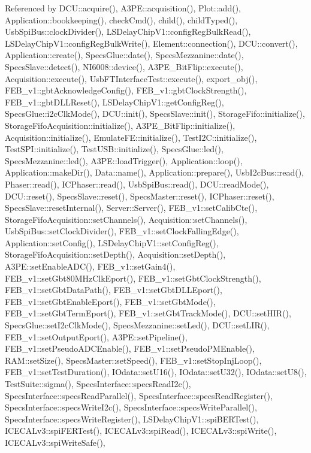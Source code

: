 Referenced by D\+C\+U\+::acquire(), A3\+P\+E\+::acquisition(), Plot\+::add(), Application\+::bookkeeping(), check\+Cmd(), child(), child\+Typed(), Usb\+Spi\+Bus\+::clock\+Divider(), L\+S\+Delay\+Chip\+V1\+::config\+Reg\+Bulk\+Read(), L\+S\+Delay\+Chip\+V1\+::config\+Reg\+Bulk\+Write(), Element\+::connection(), D\+C\+U\+::convert(), Application\+::create(), Specs\+Glue\+::date(), Specs\+Mezzanine\+::date(), Specs\+Slave\+::detect(), N\+I6008\+::device(), A3\+P\+E\+\_\+\+Bit\+Flip\+::execute(), Acquisition\+::execute(), Usb\+F\+T\+Interface\+Test\+::execute(), export\+\_\+obj(), F\+E\+B\+\_\+v1\+::gbt\+Acknowledge\+Config(), F\+E\+B\+\_\+v1\+::gbt\+Clock\+Strength(), F\+E\+B\+\_\+v1\+::gbt\+D\+L\+L\+Reset(), L\+S\+Delay\+Chip\+V1\+::get\+Config\+Reg(), Specs\+Glue\+::i2c\+Clk\+Mode(), D\+C\+U\+::init(), Specs\+Slave\+::init(), Storage\+Fifo\+::initialize(), Storage\+Fifo\+Acquisition\+::initialize(), A3\+P\+E\+\_\+\+Bit\+Flip\+::initialize(), Acquisition\+::initialize(), Emulate\+F\+E\+::initialize(), Test\+I2\+C\+::initialize(), Test\+S\+P\+I\+::initialize(), Test\+U\+S\+B\+::initialize(), Specs\+Glue\+::led(), Specs\+Mezzanine\+::led(), A3\+P\+E\+::load\+Trigger(), Application\+::loop(), Application\+::make\+Dir(), Data\+::name(), Application\+::prepare(), Usb\+I2c\+Bus\+::read(), Phaser\+::read(), I\+C\+Phaser\+::read(), Usb\+Spi\+Bus\+::read(), D\+C\+U\+::read\+Mode(), D\+C\+U\+::reset(), Specs\+Slave\+::reset(), Specs\+Master\+::reset(), I\+C\+Phaser\+::reset(), Specs\+Slave\+::reset\+Internal(), Server\+::\+Server(), F\+E\+B\+\_\+v1\+::set\+Calib\+Cte(), Storage\+Fifo\+Acquisition\+::set\+Channels(), Acquisition\+::set\+Channels(), Usb\+Spi\+Bus\+::set\+Clock\+Divider(), F\+E\+B\+\_\+v1\+::set\+Clock\+Falling\+Edge(), Application\+::set\+Config(), L\+S\+Delay\+Chip\+V1\+::set\+Config\+Reg(), Storage\+Fifo\+Acquisition\+::set\+Depth(), Acquisition\+::set\+Depth(), A3\+P\+E\+::set\+Enable\+A\+D\+C(), F\+E\+B\+\_\+v1\+::set\+Gain4(), F\+E\+B\+\_\+v1\+::set\+Gbt80\+M\+Hz\+Clk\+Eport(), F\+E\+B\+\_\+v1\+::set\+Gbt\+Clock\+Strength(), F\+E\+B\+\_\+v1\+::set\+Gbt\+Data\+Path(), F\+E\+B\+\_\+v1\+::set\+Gbt\+D\+L\+L\+Eport(), F\+E\+B\+\_\+v1\+::set\+Gbt\+Enable\+Eport(), F\+E\+B\+\_\+v1\+::set\+Gbt\+Mode(), F\+E\+B\+\_\+v1\+::set\+Gbt\+Term\+Eport(), F\+E\+B\+\_\+v1\+::set\+Gbt\+Track\+Mode(), D\+C\+U\+::set\+H\+I\+R(), Specs\+Glue\+::set\+I2c\+Clk\+Mode(), Specs\+Mezzanine\+::set\+Led(), D\+C\+U\+::set\+L\+I\+R(), F\+E\+B\+\_\+v1\+::set\+Output\+Eport(), A3\+P\+E\+::set\+Pipeline(), F\+E\+B\+\_\+v1\+::set\+Pseudo\+A\+D\+C\+Enable(), F\+E\+B\+\_\+v1\+::set\+Pseudo\+P\+M\+Enable(), R\+A\+M\+::set\+Size(), Specs\+Master\+::set\+Speed(), F\+E\+B\+\_\+v1\+::set\+Stop\+Inj\+Loop(), F\+E\+B\+\_\+v1\+::set\+Test\+Duration(), I\+Odata\+::set\+U16(), I\+Odata\+::set\+U32(), I\+Odata\+::set\+U8(), Test\+Suite\+::sigma(), Specs\+Interface\+::specs\+Read\+I2c(), Specs\+Interface\+::specs\+Read\+Parallel(), Specs\+Interface\+::specs\+Read\+Register(), Specs\+Interface\+::specs\+Write\+I2c(), Specs\+Interface\+::specs\+Write\+Parallel(), Specs\+Interface\+::specs\+Write\+Register(), L\+S\+Delay\+Chip\+V1\+::spi\+B\+E\+R\+Test(), I\+C\+E\+C\+A\+Lv3\+::spi\+F\+E\+R\+Test(), I\+C\+E\+C\+A\+Lv3\+::spi\+Read(), I\+C\+E\+C\+A\+Lv3\+::spi\+Write(), I\+C\+E\+C\+A\+Lv3\+::spi\+Write\+Safe(), 